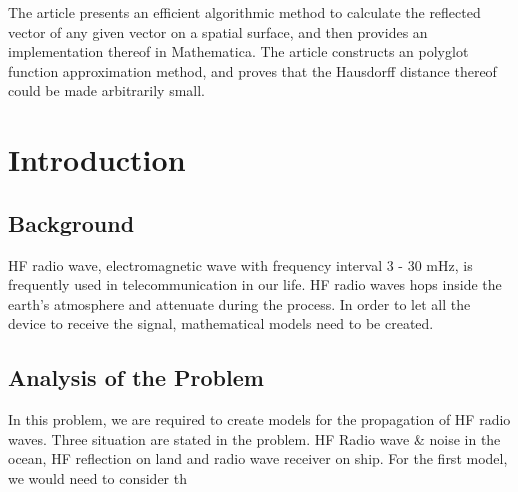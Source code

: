 \documentclass{article}
\begin{document}
The article presents an efficient algorithmic method to calculate the reflected vector of any given vector on a spatial surface, and then provides an implementation thereof in Mathematica. The article constructs an polyglot function approximation method, and proves that the Hausdorff distance thereof could be made arbitrarily small.

\pagestyle{fancy}
\fancyhf{}

\newpage
\tableofcontents

\newpage
\section{Introduction}
\subsection{Background}
HF radio wave, electromagnetic wave with frequency interval 3 - 30 mHz, is frequently used in telecommunication in our life. HF radio waves hops inside the earth's atmosphere and attenuate during the process. In order to let all the device to receive the signal, mathematical models need to be created. 
\subsection{Analysis of the Problem}
In this problem, we are required to create models for the propagation of HF radio waves. Three situation are stated in the problem. HF Radio wave & noise in the ocean, HF reflection on land and radio wave receiver on ship. For the first model, we would need to consider th
\end{document}
